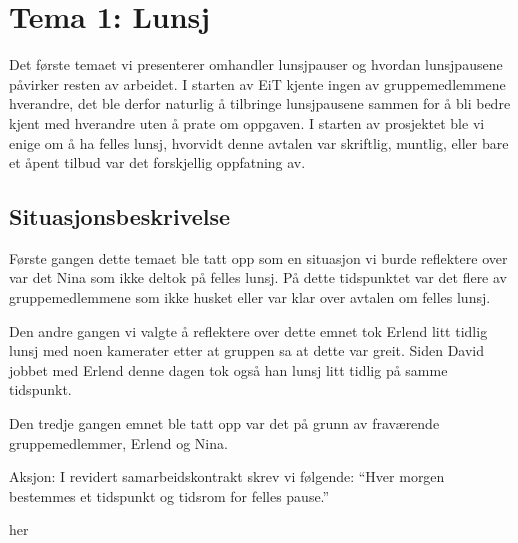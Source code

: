 \chapter{Tema 1: Lunsj}
Det første temaet vi presenterer omhandler lunsjpauser og hvordan lunsjpausene påvirker resten av arbeidet. I starten av EiT kjente ingen av gruppemedlemmene hverandre, det ble derfor naturlig å tilbringe lunsjpausene sammen for å bli bedre kjent med hverandre uten å prate om oppgaven. I starten av prosjektet ble vi enige om å ha felles lunsj, hvorvidt denne avtalen var skriftlig, muntlig, eller bare et åpent tilbud var det forskjellig oppfatning av.

\section{Situasjonsbeskrivelse}
Første gangen dette temaet ble tatt opp som en situasjon vi burde reflektere over var det Nina som ikke deltok på felles lunsj. På dette tidspunktet var det flere av gruppemedlemmene som ikke husket eller var klar over avtalen om felles lunsj. 

Den andre gangen vi valgte å reflektere over dette emnet tok Erlend litt tidlig lunsj med noen kamerater etter at gruppen sa at dette var greit. Siden David jobbet med Erlend denne dagen tok også han lunsj litt tidlig på samme tidspunkt.

Den tredje gangen emnet ble tatt opp var det på grunn av fraværende gruppemedlemmer, Erlend og Nina. 





Aksjon:
I revidert samarbeidskontrakt skrev vi følgende: ``Hver morgen bestemmes et tidspunkt og tidsrom for felles pause.''


her
